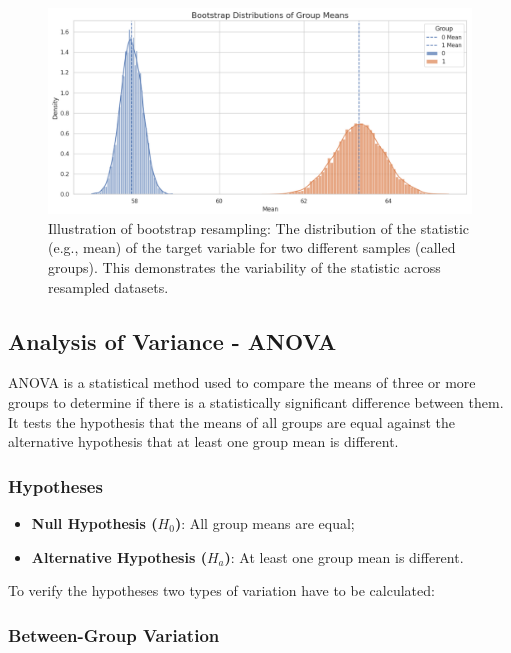 \begin{center}
\begin{figure}[H]
  \centering
  \includegraphics[width=6in]{img/bootstrap.jpg}
  \caption{Illustration of bootstrap resampling: The distribution of the
  statistic (e.g., mean) of the target variable for two different samples
(called groups). This demonstrates the variability of the statistic across
resampled datasets.}
  \label{Figure:bootstrap}
\end{figure}
\end{center}

\subsection{Analysis of Variance - ANOVA}
ANOVA is a statistical method used to compare the means of three or more groups
to determine if there is a statistically significant difference between them.
It tests the hypothesis that the means of all groups are equal against the
alternative hypothesis that at least one group mean is different.

\subsubsection*{Hypotheses}
\begin{itemize}
  \item \textbf{Null Hypothesis ($H_0$)}: All group means are equal;
  \item \textbf{Alternative Hypothesis ($H_a$)}: At least one group mean is
    different.
\end{itemize}

\noindent \noindent To verify the hypotheses two types of variation have to
be calculated:

\subsubsection*{Between-Group Variation}

